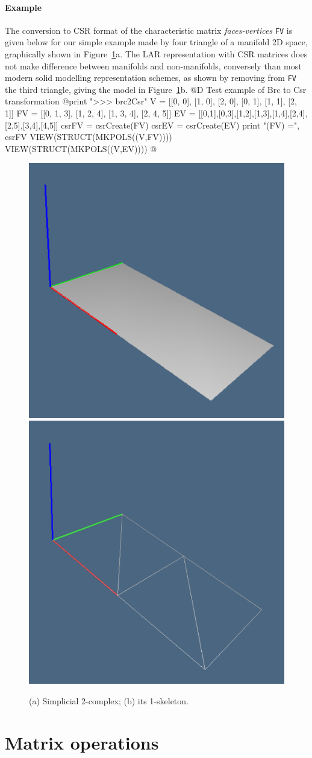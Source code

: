 \documentclass[11pt,oneside]{article}    %
\begin{document}
\paragraph{Example}
The conversion to CSR format of the characteristic matrix \emph{faces-vertices} \texttt{FV} is given below for our simple example made by four triangle of a manifold 2D space, graphically shown in Figure~\ref{fig:2D-non-manifold}a. The LAR representation with CSR matrices does not make difference between manifolds and non-manifolds, conversely than most modern solid modelling representation schemes, as shown by removing from \texttt{FV} the third triangle, giving the model in Figure~\ref{fig:2D-non-manifold}b.
@D Test example of Brc to Csr transformation
@{print "\n>>> brc2Csr"
V = [[0, 0], [1, 0], [2, 0], [0, 1], [1, 1], [2, 1]]
FV = [[0, 1, 3], [1, 2, 4], [1, 3, 4], [2, 4, 5]]
EV = [[0,1],[0,3],[1,2],[1,3],[1,4],[2,4],[2,5],[3,4],[4,5]]
csrFV = csrCreate(FV)
csrEV = csrCreate(EV)
print "\ncsrCreate(FV) =\n", csrFV
VIEW(STRUCT(MKPOLS((V,FV))))
VIEW(STRUCT(MKPOLS((V,EV))))
@}

\begin{figure}[htbp] %
   \centering
   \includegraphics[height=0.25\linewidth,width=0.25\linewidth]{images/larcc1a} 
   \includegraphics[height=0.25\linewidth,width=0.25\linewidth]{images/larcc1b} 
   \caption{(a) Simplicial 2-complex; (b) its 1-skeleton.}
   \label{fig:2D-non-manifold}
\end{figure}

\section{Matrix operations}
\end{document}
